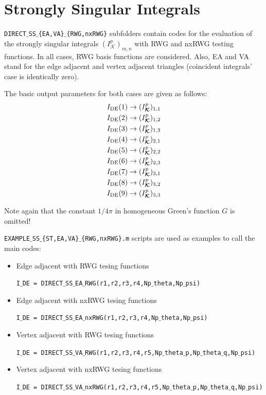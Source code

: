 \documentclass[a4wide,11pt]{article}
\newcommand{\bc}[1]{\boldsymbol{\mathcal{#1}}}
\begin{document}

\section{Strongly Singular Integrals}

\texttt{DIRECT$\_$SS$\_$\{EA,VA\}$\_$\{RWG,nxRWG\}} subfolders contain codes for the evaluation of the strongly singular integrals $(I_{\bc{K}}^p)_{m,n}$ with RWG and nxRWG testing functions. In all cases, RWG basis functions are considered. Also, EA and VA stand for the edge adjacent and vertex adjacent triangles (coincident integrals' case is identically zero).

The basic output parameters for both cases are given as follows:
\begin{equation*}
\begin{split}
I_{\rm DE}(1) \rightarrow (I_{\bc{K}}^p)_{1,1} \\
I_{\rm DE}(2) \rightarrow (I_{\bc{K}}^p)_{1,2}\\
I_{\rm DE}(3) \rightarrow (I_{\bc{K}}^p)_{1,3} \\
I_{\rm DE}(4) \rightarrow (I_{\bc{K}}^p)_{2,1} \\
I_{\rm DE}(5) \rightarrow (I_{\bc{K}}^p)_{2,2} \\
I_{\rm DE}(6) \rightarrow (I_{\bc{K}}^p)_{2,3} \\
I_{\rm DE}(7) \rightarrow (I_{\bc{K}}^p)_{3,1} \\
I_{\rm DE}(8) \rightarrow (I_{\bc{K}}^p)_{3,2} \\
I_{\rm DE}(9) \rightarrow (I_{\bc{K}}^p)_{3,3}
\end{split}
\end{equation*}

Note again that the constant $1/4\pi$ in homogeneous Green's function $G$ is omitted!

\texttt{EXAMPLE$\_$SS$\_$\{ST,EA,VA\}$\_$\{RWG,nxRWG\}.m} scripts are used as examples to call the main codes:

\begin{itemize}

\item Edge adjacent with RWG tesing functions

\texttt{I$\_$DE = DIRECT$\_$SS$\_$EA$\_$RWG(r1,r2,r3,r4,Np$\_$theta,Np$\_$psi)}

\item Edge adjacent with nxRWG tesing functions

\texttt{I$\_$DE = DIRECT$\_$SS$\_$EA$\_$nxRWG(r1,r2,r3,r4,Np$\_$theta,Np$\_$psi)}

\item Vertex adjacent with RWG tesing functions

\texttt{I$\_$DE = DIRECT$\_$SS$\_$VA$\_$RWG(r1,r2,r3,r4,r5,Np$\_$theta$\_$p,Np$\_$theta$\_$q,Np$\_$psi)}

\item Vertex adjacent with nxRWG tesing functions

\texttt{I$\_$DE = DIRECT$\_$SS$\_$VA$\_$nxRWG(r1,r2,r3,r4,r5,Np$\_$theta$\_$p,Np$\_$theta$\_$q,Np$\_$psi)}

\end{itemize}
\end{document}
